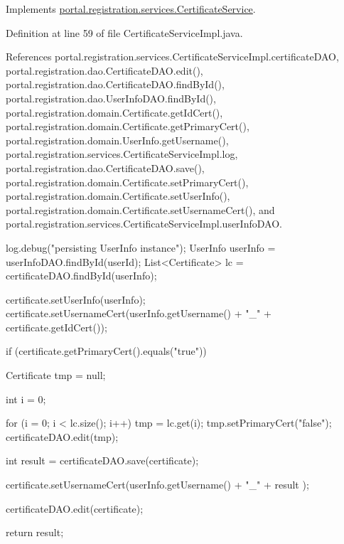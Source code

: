 Implements \hyperlink{interfaceportal_1_1registration_1_1services_1_1CertificateService_a3108e28c65788d0157a991abf6a4adc7}{portal.registration.services.CertificateService}.



Definition at line 59 of file CertificateServiceImpl.java.



References portal.registration.services.CertificateServiceImpl.certificateDAO, portal.registration.dao.CertificateDAO.edit(), portal.registration.dao.CertificateDAO.findById(), portal.registration.dao.UserInfoDAO.findById(), portal.registration.domain.Certificate.getIdCert(), portal.registration.domain.Certificate.getPrimaryCert(), portal.registration.domain.UserInfo.getUsername(), portal.registration.services.CertificateServiceImpl.log, portal.registration.dao.CertificateDAO.save(), portal.registration.domain.Certificate.setPrimaryCert(), portal.registration.domain.Certificate.setUserInfo(), portal.registration.domain.Certificate.setUsernameCert(), and portal.registration.services.CertificateServiceImpl.userInfoDAO.


\begin{DoxyCode}
                                                             {
                log.debug("persisting UserInfo instance");
                UserInfo userInfo = userInfoDAO.findById(userId);
                List<Certificate> lc = certificateDAO.findById(userInfo);

                certificate.setUserInfo(userInfo);
                certificate.setUsernameCert(userInfo.getUsername() + "_"
                                + certificate.getIdCert());

                if (certificate.getPrimaryCert().equals("true")) {

                        Certificate tmp = null;

                        int i = 0;

                        for (i = 0; i < lc.size(); i++) {
                                tmp = lc.get(i);
                                tmp.setPrimaryCert("false");
                                certificateDAO.edit(tmp);
                        }
                }

                int result = certificateDAO.save(certificate);

                certificate.setUsernameCert(userInfo.getUsername() + "_" + result
      );

                certificateDAO.edit(certificate);

                return result;
        }
\end{DoxyCode}


